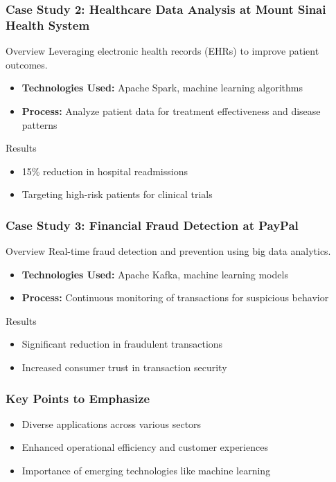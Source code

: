 \documentclass[aspectratio=169]{beamer}
\begin{document}
\begin{frame}[fragile]
    \frametitle{Case Study 2: Healthcare Data Analysis at Mount Sinai Health System}
    \begin{block}{Overview}
        Leveraging electronic health records (EHRs) to improve patient outcomes.
    \end{block}
    \begin{itemize}
        \item \textbf{Technologies Used:} Apache Spark, machine learning algorithms
        \item \textbf{Process:} Analyze patient data for treatment effectiveness and disease patterns
    \end{itemize}
    \begin{block}{Results}
        \begin{itemize}
            \item 15\% reduction in hospital readmissions
            \item Targeting high-risk patients for clinical trials
        \end{itemize}
    \end{block}
\end{frame}

\begin{frame}[fragile]
    \frametitle{Case Study 3: Financial Fraud Detection at PayPal}
    \begin{block}{Overview}
        Real-time fraud detection and prevention using big data analytics.
    \end{block}
    \begin{itemize}
        \item \textbf{Technologies Used:} Apache Kafka, machine learning models
        \item \textbf{Process:} Continuous monitoring of transactions for suspicious behavior
    \end{itemize}
    \begin{block}{Results}
        \begin{itemize}
            \item Significant reduction in fraudulent transactions
            \item Increased consumer trust in transaction security
        \end{itemize}
    \end{block}
\end{frame}

\begin{frame}[fragile]
    \frametitle{Key Points to Emphasize}
    \begin{itemize}
        \item Diverse applications across various sectors
        \item Enhanced operational efficiency and customer experiences
        \item Importance of emerging technologies like machine learning
    \end{itemize}
\end{frame}
\end{document}
